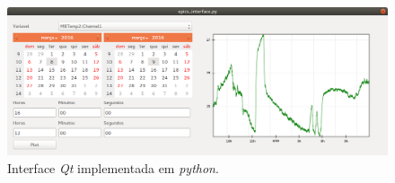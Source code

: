 % 
% 
% 
% 
% 


\begin{figure}[h]
    
    \centering
    \includegraphics[scale=0.30]{image/screenshot-python}
    \caption {Interface \textit{Qt} implementada em \textit{python}.}
    \label{fig:interface} 
\end{figure} 